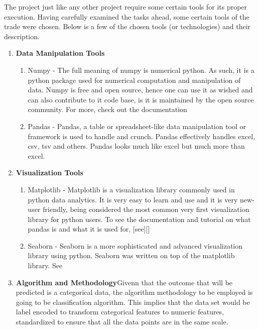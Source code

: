 \pagestyle{fancy}
The project just like any other project require some certain tools for its proper execution. Having carefully examined the tasks ahead, some certain tools of the trade were chosen. Below is a few of the chosen tools (or technologies) and their description. 
\begin{enumerate}
	\item \textbf{Data Manipulation Tools}
		\begin{enumerate}
			\item Numpy - The full meaning of numpy is numerical python. As such, it is a python package used for numerical computation and manipulation of data. Numpy is free and open source, hence one can use it as wished and can also contribute to it code base, is it is maintained by the open source community. For more, check out the documentation \cite{NumPyDocumentation}
			
			\item Pandas - Pandas, a table or spreadsheet-like data manipulation tool or framework is used to handle and crunch. Pandas effectively handles excel, csv, tsv and others. Pandas looks much like excel but much more than excel. \cite{PandasDocumentationPandas}
		\end{enumerate} 
	\item \textbf{Visualization Tools}
		\begin{enumerate}
			\item Matplotlib - Matplotlib is a visualization library commonly used in python data analytics. It is very easy to learn and use and it is very new-user friendly, being considered the most common very first visualization library for python users. To see the documentation and tutorial on what pandas is and what it is used for, [see][]\cite{GettingStartedPandas}
			\item Seaborn - Seaborn is a more sophisticated and advanced visualization library using python. Seaborn was written on top of the matplotlib library. See \cite{IntroductionSeabornSeaborn}
		\end{enumerate} 
		
	\item \textbf{Algorithm and Methodology}Givenn that the outcome that will be predicted is a categorical data, the algorithm methodology to be employed is going to be classification algorithm. This implies that the data set would be label encoded to transform categorical features to numeric features, standardized to ensure that all the data points are in the same scale.


\end{enumerate}
